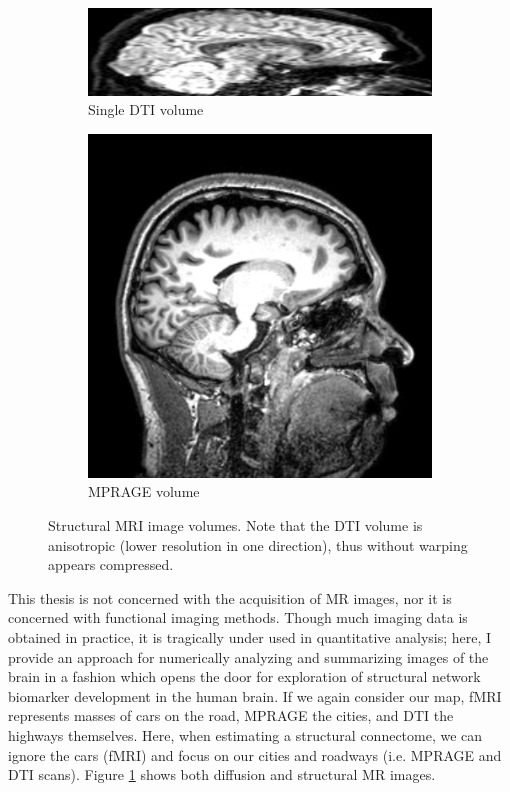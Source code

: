 \begin{figure}[h!]
\centering
\begin{subfigure}[h!]{0.45\textwidth}
\centering
\includegraphics[scale=0.2]{./figs/KKI2009-01-DTI.png}
\makeatletter
\let\@currsize\normalsize
\caption{Single DTI volume}
\end{subfigure}
\begin{subfigure}[h!]{0.45\textwidth}
\centering
\includegraphics[scale=0.35]{./figs/KKI2009-01-MPRAGE.png}
\makeatletter
\let\@currsize\normalsize
\caption{MPRAGE volume}
\end{subfigure}
\makeatletter
\let\@currsize\normalsize
\caption{Structural MRI image volumes. Note that the DTI volume is anisotropic (lower resolution in one direction), thus without warping appears compressed.}
\label{fig:mri}
\end{figure}


This thesis is not concerned with the acquisition of MR images, nor it is concerned with functional imaging methods. Though much imaging data is obtained in practice, it is tragically under used in quantitative analysis; here, I provide an approach for numerically analyzing and summarizing images of the brain in a fashion which opens the door for exploration of structural network biomarker development in the human brain. If we again consider our map, fMRI represents masses of cars on the road, MPRAGE the cities, and DTI the highways themselves. Here, when estimating a structural connectome, we can ignore the cars (fMRI) and focus on our cities and roadways (i.e. MPRAGE and DTI scans). Figure \ref{fig:mri} shows both diffusion and structural MR images.

